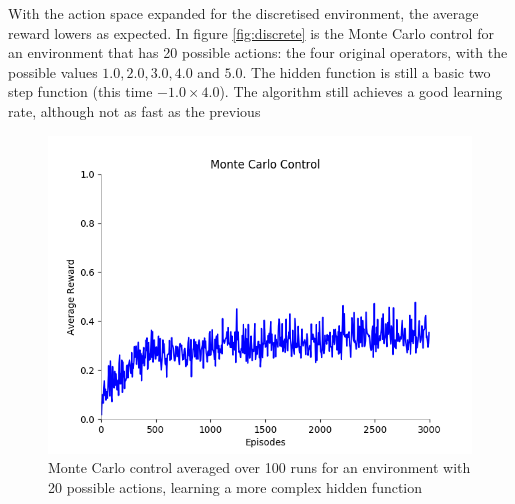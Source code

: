 With the action space expanded for the discretised environment, the average reward lowers as expected. In figure \ref{fig:discrete} is the Monte Carlo control for an environment that has 20 possible actions: the four original operators, with the possible values $1.0,2.0,3.0,4.0$ and $5.0$. The hidden function is still a basic two step function (this time $-1.0\times4.0$). The algorithm still achieves a good learning rate, although not as fast as the previous  

\begin{figure}[h]
\includegraphics[width=\textwidth]{resultscomplexmc/413_100runs_3000normalised}
\caption[Monte Carlo Control for the discretised environment with complex function]{Monte Carlo control averaged over 100 runs for an environment with 20 possible actions, learning a more complex hidden function}
\end{figure}

